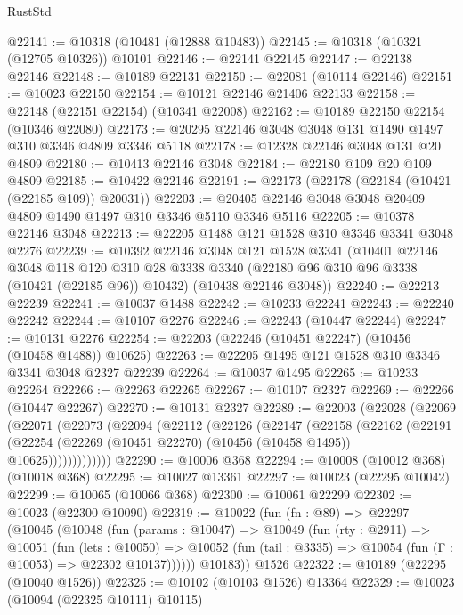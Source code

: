 \begin{lexlean}{RustStd}
\begin{coremodule}
@22141 := @10318 (@10481 (@12888 @10483))
@22145 := @10318 (@10321 (@12705 @10326)) @10101
@22146 := @22141 @22145
@22147 := @22138 @22146
@22148 := @10189 @22131
@22150 := @22081 (@10114 @22146)
@22151 := @10023 @22150
@22154 := @10121 @22146 @21406 @22133
@22158 := @22148 (@22151 @22154) (@10341 @22008)
@22162 := @10189 @22150 @22154 (@10346 @22080)
@22173 := @20295 @22146 @3048 @3048 @131 @1490 @1497 @310 @3346 @4809 @3346 @5118
@22178 := @12328 @22146 @3048 @131 @20 @4809
@22180 := @10413 @22146 @3048
@22184 := @22180 @109 @20 @109 @4809
@22185 := @10422 @22146
@22191 := @22173 (@22178 (@22184 (@10421 (@22185 @109)) @20031))
@22203 := @20405 @22146 @3048 @3048 @20409 @4809 @1490 @1497 @310 @3346 @5110 @3346 @5116
@22205 := @10378 @22146 @3048
@22213 := @22205 @1488 @121 @1528 @310 @3346 @3341 @3048 @2276
@22239 := @10392
    @22146
    @3048
    @121
    @1528
    @3341
    (@10401
      @22146
      @3048
      @118
      @120
      @310
      @28
      @3338
      @3340
      (@22180 @96 @310 @96 @3338 (@10421 (@22185 @96)) @10432)
      (@10438 @22146 @3048))
@22240 := @22213 @22239
@22241 := @10037 @1488
@22242 := @10233 @22241
@22243 := @22240 @22242
@22244 := @10107 @2276
@22246 := @22243 (@10447 @22244)
@22247 := @10131 @2276
@22254 := @22203 (@22246 (@10451 @22247) (@10456 (@10458 @1488)) @10625)
@22263 := @22205 @1495 @121 @1528 @310 @3346 @3341 @3048 @2327 @22239
@22264 := @10037 @1495
@22265 := @10233 @22264
@22266 := @22263 @22265
@22267 := @10107 @2327
@22269 := @22266 (@10447 @22267)
@22270 := @10131 @2327
@22289 := @22003
    (@22028
      (@22069
        (@22071
          (@22073
            (@22094
              (@22112
                (@22126
                  (@22147
                    (@22158
                      (@22162
                        (@22191
                          (@22254
                            (@22269 (@10451 @22270) (@10456 (@10458 @1495)) @10625)))))))))))))
@22290 := @10006 @368
@22294 := @10008 (@10012 @368) (@10018 @368)
@22295 := @10027 @13361
@22297 := @10023 (@22295 @10042)
@22299 := @10065 (@10066 @368)
@22300 := @10061 @22299
@22302 := @10023 (@22300 @10090)
@22319 := @10022
    (fun (fn : @89) =>
    @22297
      (@10045
        (@10048
          (fun (params : @10047) =>
          @10049
            (fun (rty : @2911) =>
            @10051
              (fun (lets : @10050) =>
              @10052 (fun (tail : @3335) => @10054 (fun (Γ : @10053) => @22302 @10137))))))
        @10183))
    @1526
@22322 := @10189 (@22295 (@10040 @1526))
@22325 := @10102 (@10103 @1526) @13364
@22329 := @10023 (@10094 (@22325 @10111) @10115)

\end{coremodule}
\end{lexlean}
